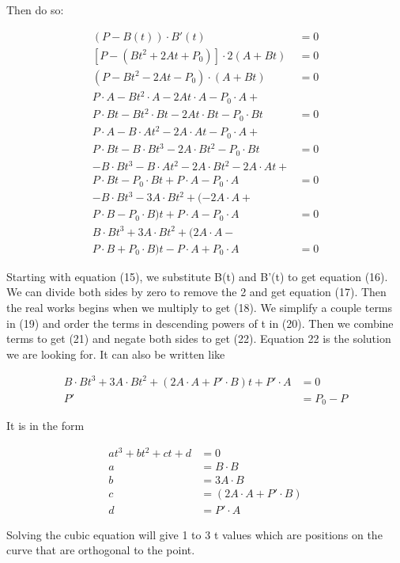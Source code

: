 \documentclass{article}
\begin{document}
Then do so:

\begin{align}
(P - B(t)) \cdot B'(t) &= 0 \\
[P - (B t^2 + 2 A t + P_0)] \cdot 2(A+Bt) &= 0 \\
(P - B t^2 - 2 A t - P_0) \cdot (A+Bt) &= 0 \\
P \cdot A - B t^2 \cdot A - 2 A t \cdot A - P_0 \cdot A + \\
P \cdot Bt - B t^2 \cdot Bt - 2 A t \cdot Bt - P_0 \cdot Bt &= 0 \nonumber \\
P \cdot A - B \cdot A t^2 - 2 A \cdot A t - P_0 \cdot A + \\
P \cdot Bt - B \cdot B t^3 - 2 A \cdot B t^2 - P_0 \cdot Bt &= 0 \nonumber \\
-B \cdot B t^3 - B \cdot A t^2 - 2 A \cdot B t^2 - 2 A \cdot A t + \\
P \cdot Bt - P_0 \cdot Bt + P \cdot A - P_0 \cdot A &= 0 \nonumber \\
-B \cdot B t^3 - 3 A \cdot B t^2 + (- 2 A \cdot A + \\
P \cdot B - P_0 \cdot B)t + P \cdot A - P_0 \cdot A &= 0 \nonumber \\
B \cdot B t^3 + 3 A \cdot B t^2 + (2 A \cdot A - \\
P \cdot B + P_0 \cdot B)t - P \cdot A + P_0 \cdot A &= 0 \nonumber
\end{align}

Starting with equation (15), we substitute B(t) and B'(t) to get equation (16). We can divide both sides by zero to remove the 2 and get equation (17). Then the real works begins when we multiply to get (18). We simplify a couple terms in (19) and order the terms in descending powers of t in (20). Then we combine terms to get (21) and negate both sides to get (22). Equation 22 is the solution we are looking for. It can also be written like

\begin{align}
B \cdot B t^3 + 3 A \cdot B t^2 + (2 A \cdot A + P' \cdot B)t + P' \cdot A &= 0 \\
P' &= P_0 - P \nonumber
\end{align}

It is in the form

\begin{align}
at^3 + bt^2 + ct + d &= 0 \\
a &= B \cdot B \nonumber \\
b &= 3 A \cdot B \nonumber \\
c &= (2 A \cdot A + P' \cdot B) \nonumber \\
d &= P' \cdot A \nonumber
\end{align}

Solving the cubic equation will give 1 to 3 t values which are positions on the curve that are orthogonal to the point.
\end{document}
